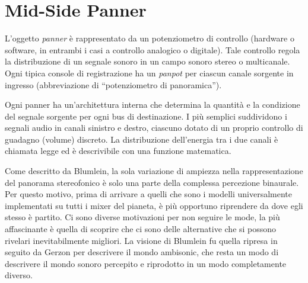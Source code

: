 \section{Mid-Side Panner}
\label{sec:mspanner}

L'oggetto \emph{panner} è rappresentato da un potenziometro di controllo
(hardware o software, in entrambi i casi a controllo analogico o digitale). Tale
controllo regola la distribuzione di un segnale sonoro in un campo sonoro stereo o multicanale. Ogni tipica console di registrazione ha un \emph{panpot} per
ciascun canale sorgente in ingresso (abbreviazione di “potenziometro di
panoramica”).

Ogni panner ha un'architettura interna che determina la quantità e la condizione
del segnale sorgente per ogni bus di destinazione. I più semplici suddividono i
segnali audio in canali sinistro e destro, ciascuno dotato di un proprio
controllo di guadagno (volume) discreto. La distribuzione dell'energia tra i due
canali è chiamata legge ed è descrivibile con una funzione matematica.

Come descritto da Blumlein, la sola variazione di ampiezza nella rappresentazione
del panorama stereofonico è solo una parte della complessa percezione binaurale.
Per questo motivo, prima di arrivare a quelli che sono i modelli universalmente
implementati su tutti i mixer del pianeta, è più opportuno riprendere da dove
egli stesso è partito. Ci sono diverse motivazioni per non seguire le mode, la
più affascinante è quella di scoprire che ci sono delle alternative che si possono
rivelari inevitabilmente migliori. La visione di Blumlein fu quella ripresa in
seguito da Gerzon per descrivere il mondo ambisonic, che resta un modo di
descrivere il mondo sonoro percepito e riprodotto in un modo completamente diverso.

